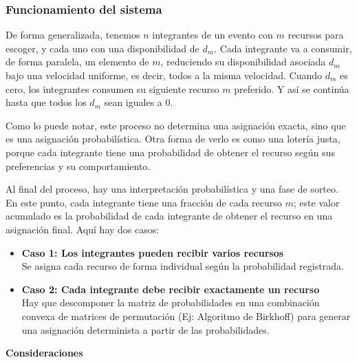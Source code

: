 \documentclass{article}
\begin{document}
\subsubsection{Funcionamiento del sistema}

De forma generalizada, tenemos $n$ integrantes de un evento con $m$ recursos para escoger, y cada uno con 
una disponibilidad de $d_{m}$. Cada integrante va a consumir, de forma paralela, un elemento de $m$, 
reduciendo su
disponibilidad asociada $d_{m}$ bajo una velocidad uniforme, es decir, todos a la misma velocidad.
Cuando $d_{m}$ es cero, los integrantes consumen su siguiente recurso $m$ preferido. Y así se continúa
hasta que todos los $d_{m}$ sean iguales a 0.

Como lo puede notar, este proceso no determina una asignación exacta, sino que es una asignación
probabilística. Otra forma de verlo es como una lotería justa, porque cada integrante tiene una 
probabilidad de obtener el recurso según sus preferencias y su comportamiento.

Al final del proceso, hay una interpretación probabilística y una fase de sorteo. En este punto, cada
integrante tiene una fracción de cada recurso $m$; este valor acumulado es la probabilidad de 
cada integrante de obtener el recurso en una asignación final. Aquí hay dos casos:\\

\begin{itemize}
  \item \textbf{Caso 1: Los integrantes pueden recibir varios recursos}\\
        Se asigna cada recurso de forma individual según la probabilidad registrada.
  \item \textbf{Caso 2: Cada integrante debe recibir exactamente un recurso}\\
        Hay que descomponer la matriz de probabilidades en una combinación convexa de matrices
        de permutación (Ej: Algoritmo de Birkhoff) para generar una asignación determinista a partir de las probabilidades.
\end{itemize}

\textbf{Consideraciones}
\end{document}
